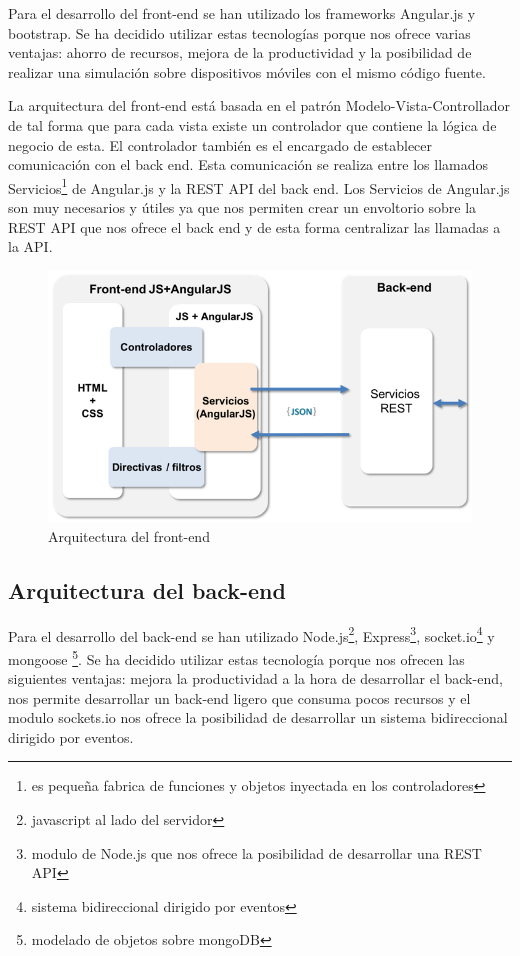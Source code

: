 Para el desarrollo del front-end se han utilizado los frameworks Angular.js y bootstrap. Se ha decidido utilizar estas tecnologías porque nos ofrece varias ventajas: ahorro de recursos, mejora de la productividad y la posibilidad de realizar una simulación sobre dispositivos móviles con el mismo código fuente.

La arquitectura del front-end está basada en el patrón Modelo-Vista-Controllador de tal forma que para cada vista existe un controlador que contiene la lógica de negocio de esta. El controlador también es el encargado de establecer comunicación con el back end. Esta comunicación se realiza entre los llamados Servicios\footnote{es pequeña fabrica de funciones y objetos inyectada en los controladores} de Angular.js y la REST API del back end. Los Servicios de Angular.js son muy necesarios y útiles ya que nos permiten crear un envoltorio sobre la REST API que nos ofrece el back end y de esta forma centralizar las llamadas a la API.

\begin{figure}[H]
\centering\includegraphics[scale=0.5]{imagenes/arquitectura-front-end.png}
\caption{Arquitectura del front-end}
\label{arquitecturaFrontEnd}
\end{figure}

\subsection{Arquitectura del back-end}

Para el desarrollo del back-end se han utilizado Node.js\footnote{javascript al lado del servidor}, Express\footnote{modulo de Node.js que nos ofrece la posibilidad de desarrollar una REST API}, socket.io\footnote{sistema bidireccional dirigido por eventos} y mongoose \footnote{modelado de objetos sobre mongoDB}. Se ha decidido utilizar estas tecnología porque nos ofrecen las siguientes ventajas: mejora la productividad a la hora de desarrollar el back-end, nos permite desarrollar un back-end ligero que consuma pocos recursos y el modulo sockets.io nos ofrece la posibilidad de desarrollar un sistema bidireccional dirigido por eventos.


